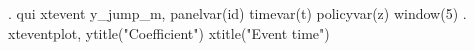 . qui xtevent y_jump_m, panelvar(id) timevar(t) policyvar(z) window(5) 
{\smallskip}
. xteventplot, ytitle("Coefficient") xtitle("Event time")
